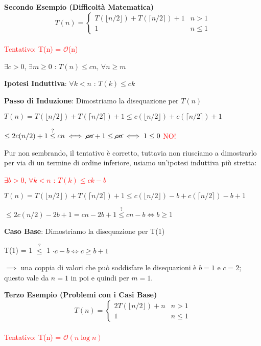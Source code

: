 \documentclass[../cheatSheetAlgoritmi.tex]{subfiles}
\begin{document}
\bigskip

\textbf{Secondo Esempio (Difficoltà Matematica)}
	\begin{equation*}
  		T(n)=\begin{cases}
    		T(\lfloor n/2 \rfloor) + T(\lceil n/2 \rceil) + 1 & \text{$n > 1$}\\
    		1 & \text{$n \leq 1$}
  		\end{cases}
	\end{equation*}
\hfill\\
\textcolor{red}{Tentativo: T(n) = $\mathcal{O}$(n)}

$\exists c > 0$, $\exists m \geq 0$ : $T(n) \leq cn$, $\forall n \geq m$

\bigskip

\textbf{Ipotesi Induttiva}: $\forall k < n$ : $T(k) \leq ck$

\textbf{Passo di Induzione}: Dimostriamo la disequazione per $T(n)$

$T(n) =  T(\lfloor n/2 \rfloor) + T(\lceil n/2 \rceil) + 1 \leq c(\lfloor n/2 \rfloor) + c(\lceil n/2 \rceil) + 1$

$\leq 2c(n/2) + 1 \stackrel{?}{\leq} cn \iff \cancel{cn} + 1 \leq \cancel{cn} \iff 1 \leq 0$ \textcolor{red}{NO!}

\bigskip

Pur non sembrando, il tentativo è corretto, tuttavia non riusciamo a dimostrarlo per via di un termine di ordine inferiore, usiamo un'ipotesi induttiva più stretta:

\textcolor{red}{$\exists b > 0$, $\forall k < n$ : $T(k) \leq ck - b$}

$T(n) =  T(\lfloor n/2 \rfloor) + T(\lceil n/2 \rceil) + 1 \leq c(\lfloor n/2 \rfloor) - b + c(\lceil n/2 \rceil) - b + 1$

$\leq 2c(n/2) - 2b + 1 = cn - 2b + 1 \stackrel{?}{\leq} cn - b \iff b \geq 1$

\bigskip

\textbf{Caso Base}: Dimostriamo la disequazione per T(1)

T(1) = 1 $\stackrel{?}{\leq}$ 1 $\cdot c - b \iff c \geq b + 1$

\bigskip

$\implies$ una coppia di valori che può soddisfare le disequazioni è $b = 1$ e $c = 2$; questo vale da $n = 1$ in poi e quindi per $m = 1$.

\bigskip

\textbf{Terzo Esempio (Problemi con i Casi Base)}
	\begin{equation*}
  		T(n)=\begin{cases}
    		2T(\lfloor n/2 \rfloor) + n & \text{$n > 1$}\\
    		1 & \text{$n \leq 1$}
  		\end{cases}
	\end{equation*}
\hfill\\
\textcolor{red}{Tentativo: T(n) = $\mathcal{O}(n\log{n})$}
\end{document}
